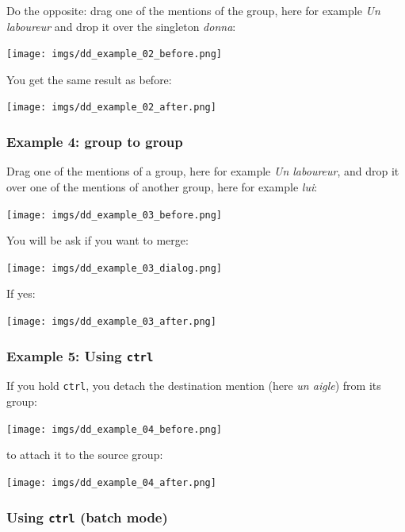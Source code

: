 \documentclass[12pt]{article}
\begin{document}
Do the opposite: drag one of the mentions of the group, here for example
\emph{Un laboureur} and drop it over the singleton \emph{donna}:\nopagebreak

\texttt{[image: imgs/dd\_example\_02\_before.png]}

You get the same result as before:\nopagebreak

\texttt{[image: imgs/dd\_example\_02\_after.png]}

 \subsubsection{Example 4: group to group}

\label{sec:merging-example}

Drag one of the mentions of a group, here for example \emph{Un laboureur},
and drop it over one of the mentions of another group, here for example 
\emph{lui}:\nopagebreak

\texttt{[image: imgs/dd\_example\_03\_before.png]}

You will be ask if you want to merge:\nopagebreak

\texttt{[image: imgs/dd\_example\_03\_dialog.png]}

If yes:\nopagebreak

\texttt{[image: imgs/dd\_example\_03\_after.png]}

 \subsubsection{Example 5: Using \texttt{ctrl}}

If you hold \verb|ctrl|, you detach the destination mention (here \emph{un
aigle}) from its group:\nopagebreak

\texttt{[image: imgs/dd\_example\_04\_before.png]}

to attach it to the source group:\nopagebreak

\texttt{[image: imgs/dd\_example\_04\_after.png]}

 \subsubsection{Using \texttt{ctrl} (batch mode)}
\end{document}
